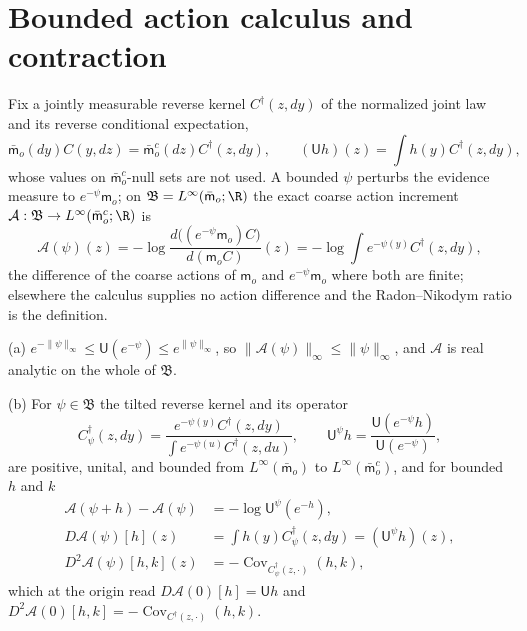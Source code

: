 \section{Bounded action calculus and contraction}
\label{sec:rg-local-action-calculus}
\label{sec:rg-action-contraction}

\label{prop:rg-action-bounded-recentering}%
Fix a jointly measurable reverse kernel $C^\dagger(z,dy)$ of the normalized joint
law and its reverse conditional expectation,
\begin{equation}
\bar{\mathsf m}_o(dy)C(y,dz)=\bar{\mathsf m}_o^c(dz)C^\dagger(z,dy),
\qquad
(\mathsf Uh)(z)=\int h(y)C^\dagger(z,dy),
\label{eq:rg-normalized-reverse-kernel}
\end{equation}
whose values on $\bar{\mathsf m}_o^c$-null sets are not used. A bounded $\psi$
perturbs the evidence measure to $e^{-\psi}\mathsf m_o$; on
$\mathfrak B=L^\infty(\bar{\mathsf m}_o;\R)$ the exact coarse action increment
$\mathcal A:\mathfrak B\to L^\infty(\bar{\mathsf m}_o^c;\R)$ is
\begin{equation}
\mathcal A(\psi)(z)
=-\log\frac{d\bigl((e^{-\psi}\mathsf m_o)C\bigr)}{d(\mathsf m_oC)}(z)
=-\log\int e^{-\psi(y)}C^\dagger(z,dy),
\label{eq:rg-local-action-map}
\end{equation}
the difference of the coarse actions of $\mathsf m_o$ and $e^{-\psi}\mathsf m_o$
where both are finite; elsewhere the calculus supplies no action difference and the
Radon--Nikodym ratio is the definition.

(a) $e^{-\lVert\psi\rVert_\infty}\le\mathsf U(e^{-\psi})\le e^{\lVert\psi\rVert_\infty}$,
so $\lVert\mathcal A(\psi)\rVert_\infty\le\lVert\psi\rVert_\infty$, and $\mathcal A$
is real analytic on the whole of $\mathfrak B$.

(b) For $\psi\in\mathfrak B$ the tilted reverse kernel and its operator
\begin{equation}
C^\dagger_\psi(z,dy)=
\frac{e^{-\psi(y)}C^\dagger(z,dy)}{\int e^{-\psi(u)}C^\dagger(z,du)},
\qquad
\mathsf U^\psi h=\frac{\mathsf U(e^{-\psi}h)}{\mathsf U(e^{-\psi})},
\label{eq:rg-tilted-reverse-kernel}
\end{equation}
are positive, unital, and bounded from $L^\infty(\bar{\mathsf m}_o)$ to
$L^\infty(\bar{\mathsf m}_o^c)$, and for bounded $h$ and $k$
\begin{align}
\mathcal A(\psi+h)-\mathcal A(\psi)&=-\log\mathsf U^\psi(e^{-h}),
\label{eq:rg-action-recentering-identity}\\
D\mathcal A(\psi)[h](z)&=\int h(y)C^\dagger_\psi(z,dy)=(\mathsf U^\psi h)(z),
\label{eq:rg-action-first-frechet-general}\\
D^2\mathcal A(\psi)[h,k](z)&=
-\operatorname{Cov}_{C^\dagger_\psi(z,\cdot)}(h,k),
\label{eq:rg-action-second-frechet-general}
\end{align}
which at the origin read $D\mathcal A(0)[h]=\mathsf Uh$ and
$D^2\mathcal A(0)[h,k]=-\operatorname{Cov}_{C^\dagger(z,\cdot)}(h,k)$.

